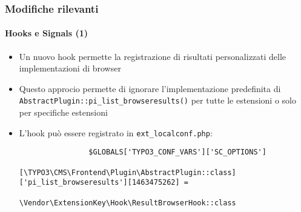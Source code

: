 \begin{frame}[fragile]
	\frametitle{Modifiche rilevanti}
	\framesubtitle{Hooks e Signals (1)}

	\lstset{basicstyle=\tiny\ttfamily}

	\begin{itemize}

		\item Un nuovo hook permette la registrazione di risultati personalizzati delle implementazioni di browser

		\item Questo approcio permette di ignorare l'implementazione predefinita di 
			\texttt{AbstractPlugin::pi\_list\_browseresults()}
			per tutte le estensioni o solo per specifiche estensioni

		\item L'hook può essere registrato in \texttt{ext\_localconf.php}:

			\begin{lstlisting}
				$GLOBALS['TYPO3_CONF_VARS']['SC_OPTIONS']
				  [\TYPO3\CMS\Frontend\Plugin\AbstractPlugin::class]['pi_list_browseresults'][1463475262] =
				  \Vendor\ExtensionKey\Hook\ResultBrowserHook::class
			\end{lstlisting}

	\end{itemize}

\end{frame}


